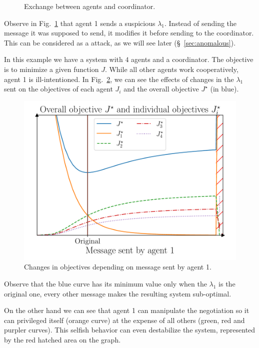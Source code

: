 \documentclass[../main.tex]{subfiles}
\begin{document}
\begin{example}
\begin{figure}[H]
    \caption{Exchange between agents and coordinator.}\label{fig:ex_exchange_agents}
  \end{figure}
  Observe in Fig.~\ref{fig:ex_exchange_agents} that agent 1 sends a suspicious $\lambda_{1}$. Instead of sending the message it was supposed to send, it modifies it before sending to the coordinator.
  This can be considered as a \fdi{} attack, as we will see later (\S~\ref{sec:anomalous}).

In this example we have a system with $4$ agents and a coordinator. The objective is to minimize a given function $J$. While all other agents work cooperatively, agent 1 is ill-intentioned. In Fig.~\ref{fig:change_in_j}, we can see the effects of changes in the $\lambda_{1}$ sent on the objectives of each agent $J_{i}$ and the overall objective $J^{\star}$ (in blue).
  \begin{figure}[H]
    \centering
    \includegraphics[width=.5\textwidth]{../img/qualitative_example.pdf}
    \caption{Changes in objectives depending on message sent by agent 1.}\label{fig:change_in_j}
  \end{figure}
  Observe that the blue curve has its minimum value only when the $\lambda_{1}$ is the original one, every other message makes the resulting system sub-optimal.

  On the other hand we can see that agent 1 can manipulate the negotiation so it can privileged itself (orange curve) at the expense of all others (green, red and purpler curves). This selfish behavior can even destabilize the system, represented by the red hatched area on the graph.
\end{example}
\end{document}
